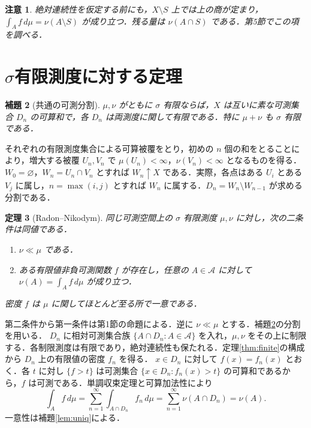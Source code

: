 \documentclass[a5paper,10pt,onecolumn]{jsarticle}
\makeatletter
\theoremstyle{mathnotetheorem}
\newtheorem{theorem}{定理}[section]
\newtheorem{lemma}[theorem]{補題}
\newtheorem{remark}[theorem]{注意}
\renewcommand{\proofname}{証明}
\renewenvironment{proof}[1][\proofname]{%
  \par\pushQED{\qed}\normalfont\topsep4\p@\@plus2\p@\relax
  \trivlist\item[\hskip\labelsep\bfseries #1]\ignorespaces
}{\popQED\endtrivlist\@endpefalse}
\makeatother
\begin{document}
\begin{remark}
絶対連続性を仮定する前にも，$X\setminus S$ 上では上の商が定まり，
$\int_A f\,d\mu=\nu(A\setminus S)$ が成り立つ．残る量は $\nu(A\cap S)$ である．第5節でこの項を調べる．
\end{remark}

\section{\texorpdfstring{$\sigma$}{σ}有限測度に対する定理}

\begin{lemma}[共通の可測分割]\label{lem:partition}
$\mu,\nu$ がともに $\sigma$ 有限ならば，$X$ は互いに素な可測集合 $D_n$ の可算和で，各 $D_n$ は両測度に関して有限である．特に $\mu+\nu$ も $\sigma$ 有限である．
\end{lemma}
\begin{proof}
それぞれの有限測度集合による可算被覆をとり，初めの $n$ 個の和をとることにより，増大する被覆 $U_n,V_n$ で $\mu(U_n)<\infty$，$\nu(V_n)<\infty$ となるものを得る．
$W_0=\varnothing$，$W_n=U_n\cap V_n$ とすれば $W_n\uparrow X$ である．実際，各点はある $U_i$ とある $V_j$ に属し，$n=\max(i,j)$ とすれば $W_n$ に属する．$D_n=W_n\setminus W_{n-1}$ が求める分割である．
\end{proof}

\begin{theorem}[Radon--Nikodym]\label{thm:rn}
同じ可測空間上の $\sigma$ 有限測度 $\mu,\nu$ に対し，次の二条件は同値である．
\begin{enumerate}
\item $\nu\ll\mu$ である．
\item ある有限値非負可測関数 $f$ が存在し，任意の $A\in\mathcal A$ に対して $\nu(A)=\int_A f\,d\mu$ が成り立つ．
\end{enumerate}
密度 $f$ は $\mu$ に関してほとんど至る所で一意である．
\end{theorem}
\begin{proof}
第二条件から第一条件は第1節の命題による．逆に $\nu\ll\mu$ とする．補題\ref{lem:partition}の分割を用いる．
$D_n$ に相対可測集合族 $\{A\cap D_n:A\in\mathcal A\}$ を入れ，$\mu,\nu$ をその上に制限する．各制限測度は有限であり，絶対連続性も保たれる．定理\ref{thm:finite}の構成から $D_n$ 上の有限値の密度 $f_n$ を得る．
$x\in D_n$ に対して $f(x)=f_n(x)$ とおく．各 $t$ に対し $\{f>t\}$ は可測集合 $\{x\in D_n:f_n(x)>t\}$ の可算和であるから，$f$ は可測である．単調収束定理と可算加法性により
\[
 \int_A f\,d\mu
  =\sum_{n=1}^{\infty}\int_{A\cap D_n} f_n\,d\mu
  =\sum_{n=1}^{\infty}\nu(A\cap D_n)=\nu(A).
\]
一意性は補題\ref{lem:uniq}による．
\end{proof}
\end{document}
